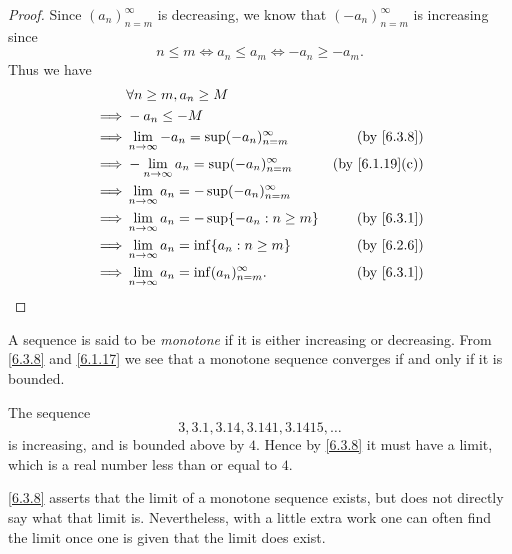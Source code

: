 \begin{proof}
  Since \((a_n)_{n = m}^\infty\) is decreasing, we know that \((-a_n)_{n = m}^\infty\) is increasing since
  \[
    n \leq m \iff a_n \leq a_m \iff -a_n \geq -a_m.
  \]
  Thus we have
  \begin{align*}
             & \forall n \geq m, a_n \geq M                                                        \\
    \implies & -a_n \leq -M                                                                        \\
    \implies & \lim_{n \to \infty} -a_n = \sup(-a_n)_{n = m}^\infty & \text{(by \cref{6.3.8})}     \\
    \implies & -\lim_{n \to \infty} a_n = \sup(-a_n)_{n = m}^\infty & \text{(by \cref{6.1.19}(c))} \\
    \implies & \lim_{n \to \infty} a_n = -\sup(-a_n)_{n = m}^\infty                                \\
    \implies & \lim_{n \to \infty} a_n = -\sup\{-a_n : n \geq m\}   & \text{(by \cref{6.3.1})}     \\
    \implies & \lim_{n \to \infty} a_n = \inf\{a_n : n \geq m\}     & \text{(by \cref{6.2.6})}     \\
    \implies & \lim_{n \to \infty} a_n = \inf(a_n)_{n = m}^\infty.  & \text{(by \cref{6.3.1})}
  \end{align*}
\end{proof}

\begin{note}
  A sequence is said to be \emph{monotone} if it is either increasing or decreasing.
  From \cref{6.3.8} and \cref{6.1.17} we see that a monotone sequence converges if and only if it is bounded.
\end{note}

\begin{example}\label{6.3.9}
  The sequence
  \[
    3, 3.1, 3.14, 3.141, 3.1415, \dots
  \]
  is increasing, and is bounded above by \(4\).
  Hence by \cref{6.3.8} it must have a limit, which is a real number less than or equal to \(4\).
\end{example}

\begin{note}
  \cref{6.3.8} asserts that the limit of a monotone sequence exists, but does not directly say what that limit is.
  Nevertheless, with a little extra work one can often find the limit once one is given that the limit does exist.
\end{note}


